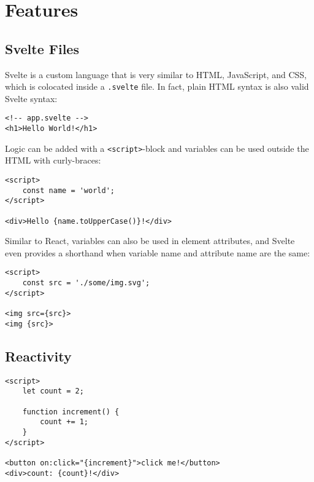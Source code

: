 \section{Features}

\subsection{Svelte Files}

Svelte is a custom language that is very similar to HTML, JavaScript, and CSS, which is colocated inside a \texttt{.svelte} file. In fact, plain HTML syntax is also valid Svelte syntax:

\begin{verbatim}
<!-- app.svelte -->
<h1>Hello World!</h1> 
\end{verbatim}
Logic can be added with a \texttt{<script>}-block and variables can be used outside the HTML with curly-braces:

\begin{verbatim}
<script>
    const name = 'world';
</script>

<div>Hello {name.toUpperCase()}!</div>
\end{verbatim}

Similar to React, variables can also be used in element attributes, and Svelte even provides a shorthand when variable name and attribute name are the same: 
\begin{verbatim}
<script>
    const src = './some/img.svg';
</script>

<img src={src}>
<img {src}> 
\end{verbatim}

\subsection{Reactivity}

\begin{verbatim}
<script>
    let count = 2;

    function increment() {
        count += 1;
    }
</script>

<button on:click="{increment}">click me!</button>
<div>count: {count}!</div>
\end{verbatim}

